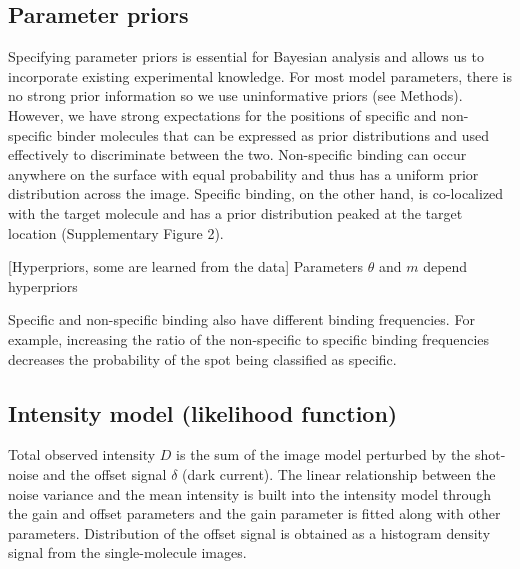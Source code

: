 \subsection*{Parameter priors}

Specifying parameter priors is essential for Bayesian analysis and allows us to incorporate existing experimental knowledge. For most model parameters, there is no strong prior information so we use uninformative priors (see Methods). However, we have strong expectations for the positions of specific and non-specific binder molecules that can be expressed as prior distributions and used effectively to discriminate between the two. Non-specific binding can occur anywhere on the surface with equal probability and thus has a uniform prior distribution across the image. Specific binding, on the other hand, is co-localized with the target molecule and has a prior distribution peaked at the target location (Supplementary Figure 2). %

[Hyperpriors, some are learned from the data] Parameters $\theta$ and $m$ depend  hyperpriors 

Specific and non-specific binding also have different binding frequencies. For example, increasing the ratio of the non-specific to specific binding frequencies decreases the probability of the spot being classified as specific. %

\subsection*{Intensity model (likelihood function)}

Total observed intensity $D$ is the sum of the image model perturbed by the shot-noise and the offset signal $\delta$ (dark current). The linear relationship between the noise variance and the mean intensity is built into the intensity model through the gain and offset parameters and the gain parameter is fitted along with other parameters. Distribution of the offset signal is obtained as a histogram density signal from the single-molecule images.

